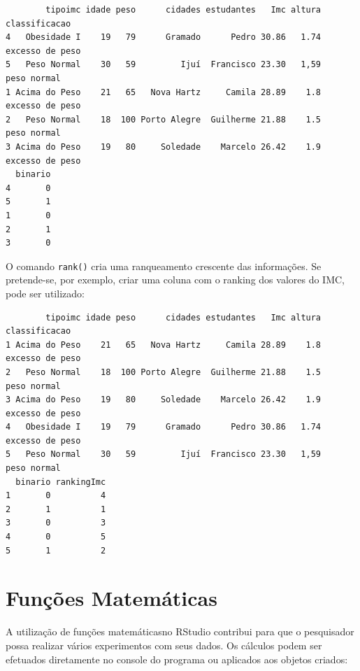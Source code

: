 \documentclass[12pt,brazil,]{book}
\newenvironment{Shaded}{\begin{snugshade}}{\end{snugshade}}
\newcommand{\KeywordTok}[1]{\textcolor[rgb]{0.13,0.29,0.53}{\textbf{#1}}}
\newcommand{\NormalTok}[1]{#1}
\newcommand{\OperatorTok}[1]{\textcolor[rgb]{0.81,0.36,0.00}{\textbf{#1}}}
\begin{document}
\begin{verbatim}
        tipoimc idade peso      cidades estudantes   Imc altura   classificacao
4   Obesidade I    19   79      Gramado      Pedro 30.86   1.74 excesso de peso
5   Peso Normal    30   59         Ijuí  Francisco 23.30   1,59     peso normal
1 Acima do Peso    21   65   Nova Hartz     Camila 28.89    1.8 excesso de peso
2   Peso Normal    18  100 Porto Alegre  Guilherme 21.88    1.5     peso normal
3 Acima do Peso    19   80     Soledade    Marcelo 26.42    1.9 excesso de peso
  binario
4       0
5       1
1       0
2       1
3       0
\end{verbatim}

O comando \texttt{rank()} cria uma ranqueamento crescente das
informações. Se pretende-se, por exemplo, criar uma coluna com o ranking
dos valores do IMC, pode ser utilizado:

\begin{Shaded}
\end{Shaded}

\begin{verbatim}
        tipoimc idade peso      cidades estudantes   Imc altura   classificacao
1 Acima do Peso    21   65   Nova Hartz     Camila 28.89    1.8 excesso de peso
2   Peso Normal    18  100 Porto Alegre  Guilherme 21.88    1.5     peso normal
3 Acima do Peso    19   80     Soledade    Marcelo 26.42    1.9 excesso de peso
4   Obesidade I    19   79      Gramado      Pedro 30.86   1.74 excesso de peso
5   Peso Normal    30   59         Ijuí  Francisco 23.30   1,59     peso normal
  binario rankingImc
1       0          4
2       1          1
3       0          3
4       0          5
5       1          2
\end{verbatim}

\hypertarget{funcoes-matematicas}{%
\section{Funções Matemáticas}\label{funcoes-matematicas}}

A utilização de funções matemáticasno RStudio contribui para que o
pesquisador possa realizar vários experimentos com seus dados. Os
cálculos podem ser efetuados diretamente no console do programa ou
aplicados aos objetos criados:
\end{document}
